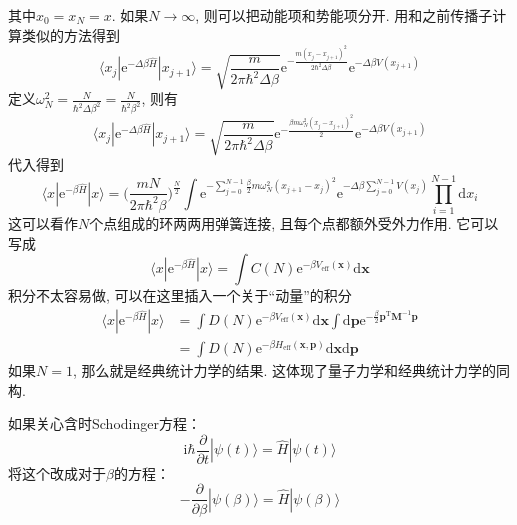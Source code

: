         其中$x_0=x_N = x$. 如果$N \to \infty$, 则可以把动能项和势能项分开. 用和之前传播子计算类似的方法得到
        \begin{equation}
            \langle x_j|\mathrm{e}^{-\Delta \beta \hat{H}} |x_{j+1} \rangle = \sqrt{\frac m{2\pi \hbar^2 \Delta \beta}} \mathrm{e}^{-\frac {m(x_j- x_{j+1})^2}{2\hbar^2 \Delta \beta}} \mathrm{e}^{-\Delta \beta V(x_{j+1})}
        \end{equation}
        定义$\omega_N^2 = \frac N{\hbar^2 \Delta \beta^2} = \frac N{\hbar^2 \beta^2}$, 则有
        \begin{equation}
            \langle x_j|\mathrm{e}^{-\Delta \beta \hat{H}} |x_{j+1} \rangle = \sqrt{\frac m{2\pi \hbar^2 \Delta \beta}} \mathrm{e}^{-\frac {\beta m\omega_N^2(x_j- x_{j+1})^2}{2}} \mathrm{e}^{-\Delta \beta V(x_{j+1})}
        \end{equation}
        代入得到 
        \begin{equation}
            \langle x|\mathrm{e}^{-\beta \hat{H}}|x\rangle  = \bigg(\frac {mN}{2\pi \hbar^2 \beta}\bigg)^{\frac N2} \int \mathrm{e}^{-\sum_{j=0}^{N-1} \frac {\beta}2 m \omega_N^2 (x_{j+1} - x_j)^2} \mathrm{e}^{-\Delta \beta \sum_{j=0}^{N-1}V(x_j)}\prod_{i=1}^{N-1}\mathrm{d}x_i
        \end{equation}
        这可以看作$N$个点组成的环两两用弹簧连接, 且每个点都额外受外力作用. 它可以写成
        \begin{equation}
            \langle x|\mathrm{e}^{-\beta \hat{H}}|x\rangle  = \int C(N) \mathrm{e}^{-\beta V_{\mathrm{eff}}(\bm{x})} \mathrm{d}\bm{x}
        \end{equation}
        积分不太容易做, 可以在这里插入一个关于“动量”的积分
        \begin{equation}\begin{aligned}
            \langle x|\mathrm{e}^{-\beta \hat{H}}|x\rangle  &= \int D(N) \mathrm{e}^{-\beta V_{\mathrm{eff}}(\bm{x})} \mathrm{d}\bm{x} \int \mathrm{d}\bm{p} \mathrm{e}^{-\frac {\beta}2 \bm{p}^{\mathrm{T}}\bm{M}^{-1} \bm{p}}\\
            &= \int D(N) \mathrm{e}^{-\beta H_{\mathrm{eff}}(\bm{x,p})} \mathrm{d}\bm{x} \mathrm{d}\bm{p}
        \end{aligned}\end{equation}
        如果$N=1$, 那么就是经典统计力学的结果. 这体现了量子力学和经典统计力学的同构. 

        如果关心含时Schodinger方程：
        \begin{equation}
            \mathrm{i}\hbar \frac {\partial}{\partial t} | \psi(t) \rangle = \hat{H}|\psi(t) \rangle
        \end{equation}
        将这个改成对于$\beta$的方程：
        \begin{equation}
            -\frac {\partial}{\partial \beta} |\psi(\beta) \rangle = \hat{H} |\psi(\beta) \rangle
        \end{equation}

